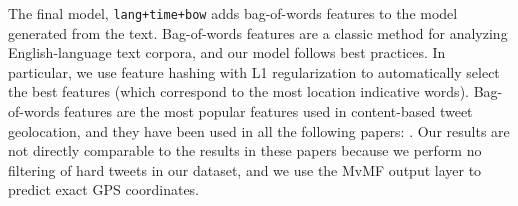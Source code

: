 \documentclass[sigconf,anonymous,review]{acmart}
\newcommand{\str}[1]{\texttt{#1}}
\newcommand{\fixme}[1]{\textcolor{red}{\textbf{FIXME:} {#1}}}
\begin{document}
\begin{description}
The final model, \str{lang+time+bow} adds bag-of-words features to the model generated from the text.
Bag-of-words features are a classic method for analyzing English-language text corpora,
and our model follows best practices.
In particular, we use feature hashing \citep{weinberger2009feature} with L1 regularization to automatically select the best features 
(which correspond to the most location indicative words).
Bag-of-words features are the most popular features used in content-based tweet geolocation,
and they have been used in all the following papers:
\citep{cheng2010you,li2012towards,han2013stacking,mahmud2014home,compton2014geotagging,zhang2014geocoding,rahimi2015twitter,dredze2016geolocation,rahimi2017neural,
maier2014language,gonccalves2015learning,tinoco2017variation}.
Our results are not directly comparable to the results in these papers because we perform no filtering of hard tweets in our dataset,
and we use the MvMF output layer to predict exact GPS coordinates.

%


\end{description}
\end{document}
